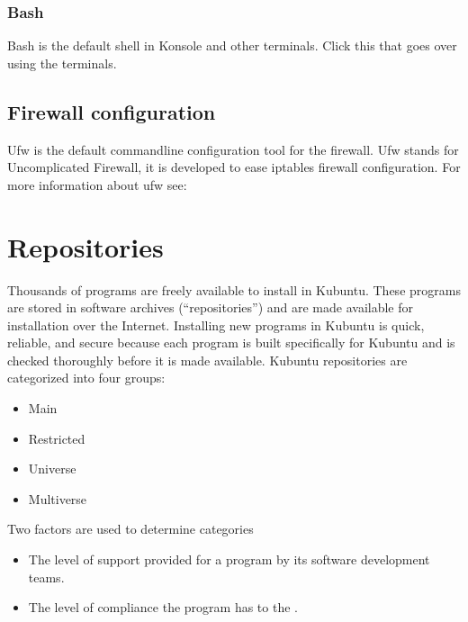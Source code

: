 \documentclass[letterpaper,10pt,english]{sphinxmanual}
\begin{document}
\subsubsection{Bash}
\label{\detokenize{docs/software-management/software:bash}}
\sphinxAtStartPar
Bash is the default shell in Konsole and other terminals. Click this  that goes over using the terminals.


\subsection{Firewall configuration}
\label{\detokenize{docs/software-management/software:firewall-configuration}}
\sphinxAtStartPar
Ufw is the default commandline configuration tool for the firewall. Ufw stands for Uncomplicated Firewall, it is developed to ease iptables firewall configuration. For more information about ufw see: 


\section{Repositories}
\label{\detokenize{docs/software-management/repositories:repositories}}\label{\detokenize{docs/software-management/repositories:repositories-link}}\label{\detokenize{docs/software-management/repositories::doc}}
\sphinxAtStartPar
Thousands of programs are freely available to install in Kubuntu. These programs are stored in software archives (“repositories”) and are made available for installation over the Internet. Installing new programs in Kubuntu is quick, reliable, and secure because each program is built specifically for Kubuntu and is checked thoroughly before it is made available. Kubuntu repositories are categorized into four groups:
\begin{itemize}
\item {} 
\sphinxAtStartPar
Main

\item {} 
\sphinxAtStartPar
Restricted

\item {} 
\sphinxAtStartPar
Universe

\item {} 
\sphinxAtStartPar
Multiverse

\end{itemize}

\sphinxAtStartPar
Two factors are used to determine categories
\begin{itemize}
\item {} 
\sphinxAtStartPar
The level of support provided for a program by its software development teams.

\item {} 
\sphinxAtStartPar
The level of compliance the program has to the .

\end{itemize}
\end{document}
